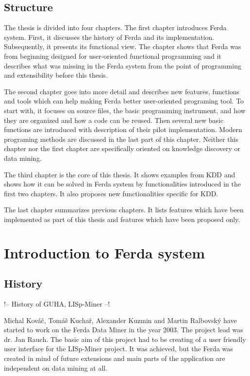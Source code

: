 \documentclass[a4paper,12pt]{book}
\begin{document}
\section*{Structure}
The thesis is divided into four chapters. The first chapter introduces Ferda system. First, it discusses the history of Ferda and its implementation. Subsequently, it presents its functional view. The chapter shows that Ferda was from beginning designed for user-oriented functional programming and it describes what was missing in the Ferda system from the point of programming and extensibility before this thesis.

The second chapter goes into more detail and describes new features, functions and tools which can help making Ferda better user-oriented programing tool. To start with, it focuses on source files, the basic programming instrument, and how they are organized and how a code can be reused. Then several new basic functions are introduced with description of their pilot implementation. Modern programing methods are discussed in the last part of this chapter. Neither this chapter nor the first chapter are specifically oriented on knowledge discovery or data mining.

The third chapter is the core of this thesis. It shows examples from KDD and shows how it can be solved in Ferda system by functionalities introduced in the first two chapters. It also proposes new functionalities specific for KDD.

The last chapter summarizes previous chapters. It lists features which have been implemented as part of this thesis and features which have been proposed only.

\chapter{Introduction to Ferda system}
\section{History}
!-- History of GUHA, LISp-Miner --!

Michal Kováč, Tomáš Kuchař, Alexander Kuzmin and Martin Ralbovský have started to work on the Ferda Data Miner in the year 2003. The project lead was dr. Jan Rauch. The basic aim of this project had to be creating of a user friendly user interface for the LISp-Miner project. It was achieved, but the Ferda was created in mind of future extensions and main parts of the application are independent on data mining at all.
\end{document}
